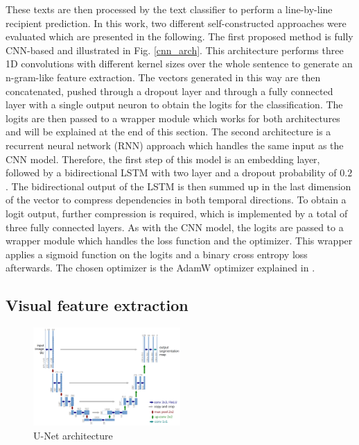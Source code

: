 \documentclass[conference]{IEEEtran}
\begin{document}
These texts are then processed by the text classifier to perform a line-by-line recipient prediction. In this work, two different self-constructed approaches were evaluated which are presented in the following. The first proposed method is fully CNN-based and illustrated in Fig. \ref{cnn_arch}. This architecture performs three 1D convolutions with different kernel sizes over the whole sentence to generate an n-gram-like feature extraction. The vectors generated in this way are then concatenated, pushed through a dropout layer and through a fully connected layer with a single output neuron to obtain the logits for the classification. The logits are then passed to a wrapper module which works for both architectures and will be explained at the end of this section. \newline
The second architecture is a recurrent neural network (RNN) approach which handles the same input as the CNN model. Therefore, the first step of this model is an embedding layer, followed by a bidirectional LSTM with two layer and a dropout probability of $0.2$. The bidirectional output of the LSTM is then summed up in the last dimension of the vector to compress dependencies in both temporal directions. To obtain a logit output, further compression is required, which is implemented by a total of three fully connected layers. As with the CNN model, the logits are passed to a wrapper module which handles the loss function and the optimizer. This wrapper applies a sigmoid function on the logits and a binary cross entropy loss afterwards. The chosen optimizer is the AdamW optimizer explained in \cite{loshchilov2019decoupled}.

\subsection{Visual feature extraction}\label{visual_feat}

\begin{figure}[htbp]
    \centering
    \includegraphics[width=0.5\textwidth]{figures/unet_architecture.png}
    \caption{U-Net architecture \cite{ronneberger2015unet}}
    \label{unet_arch}
\end{figure}
\end{document}
